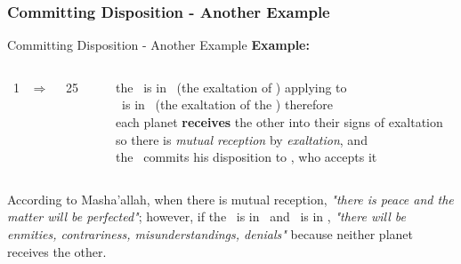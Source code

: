 \subsubsection{Committing Disposition - Another Example}
\begin{frame}[t]{Committing Disposition - Another Example}
\textbf{Example:}\footnotemark[1]
\begin{columns}[T, onlytextwidth]
\Sun\ 1 \Libra\ $\Rightarrow$ \Opposition\ \Saturn\ 25 \Aries

\rule{.1mm}{.25\textheight}

the \Sun\ is in \Libra\ (the exaltation of \Saturn) applying to \Opposition\ \Saturn \\
\Saturn\ is in \Aries\ (the exaltation of the \Sun) therefore \\
each planet \textbf{receives} the other into their signs of exaltation \\
so there is \textsl{mutual reception} by \textsl{exaltation}, and \\
the \Sun\ commits his disposition to \Saturn, who accepts it
\end{columns}
\vspace{0.25cm}
According to Masha'allah, when there is mutual reception, \textsl{"there is peace and the matter will be perfected"}; however, if the \Sun\ is in \Aries\ and \Saturn\ is in \Libra, \textsl{"there will be enmities, contrariness, misunderstandings, denials"} because neither planet receives the other.

\end{frame}

